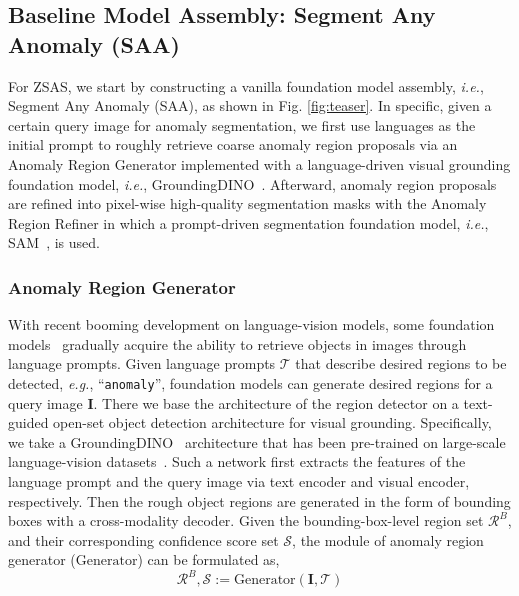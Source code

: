 \documentclass{article}
\begin{document}
\subsection{Baseline Model Assembly: Segment Any Anomaly (SAA) }

For ZSAS, we start by constructing a vanilla foundation model assembly, \textit{i.e.}, Segment Any Anomaly (SAA), as shown in Fig. \ref{fig:teaser}. In specific, given a certain query image for anomaly segmentation, we first use languages as the initial prompt to roughly retrieve coarse anomaly region proposals via an Anomaly Region Generator implemented with a language-driven visual grounding foundation model, \textit{i.e.}, GroundingDINO~\cite{liu2023grounding}. Afterward, anomaly region proposals are refined into pixel-wise high-quality segmentation masks with the Anomaly Region Refiner in which a prompt-driven segmentation foundation model, \textit{i.e.}, SAM~\cite{kirillov2023segment}, is used.


\subsubsection{Anomaly Region Generator}

With recent booming development on language-vision models, some foundation models~\cite{clipseg2022,liu2023grounding,zhong2022regionclip} gradually acquire the ability to retrieve objects in images through language prompts. Given language prompts $\mathcal{T}$ that describe desired regions to be detected, \textit{e.g.}, ``\verb|anomaly|'', foundation models can generate desired regions for  a query image $\mathbf{I}$. There we base the architecture of the region detector on a text-guided open-set object detection architecture for visual grounding. Specifically, we take a GroundingDINO~\cite{liu2023grounding} architecture that has been pre-trained on large-scale language-vision datasets~\cite{Laion400}. Such a network first extracts the features of the language prompt and the query image via text encoder and visual encoder, respectively. Then the rough object regions are generated in the form of bounding boxes with a cross-modality decoder. Given the bounding-box-level region set $\mathcal{R}^B$, and their corresponding confidence score set $\mathcal{S}$, the module of anomaly region generator ($\mathrm{Generator}$) can be formulated as,
\begin{equation}
\label{eq:det}
    \mathcal{R}^B, \mathcal{S} := \mathrm{Generator}(\mathbf{I},\mathcal{T})
\end{equation}
\end{document}
